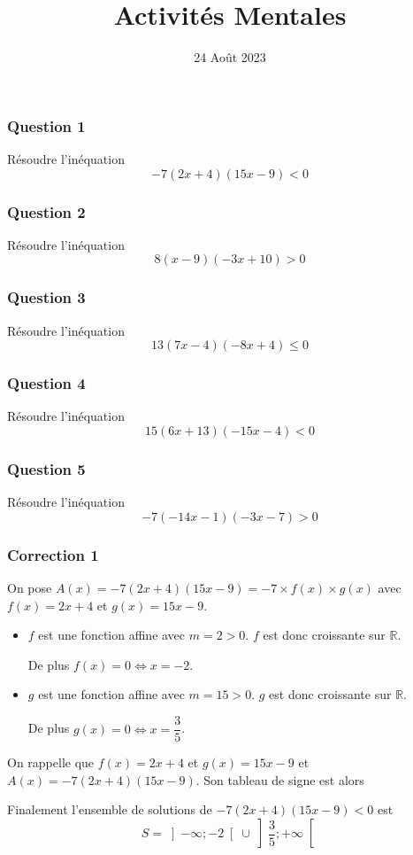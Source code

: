 \documentclass[15pt, mathserif]{beamer}
\title{Activités Mentales}
\date{24 Août 2023}
\begin{document}
\begin{frame}
    \titlepage
\end{frame}

\begin{frame} 
	\frametitle{Question 1}
Résoudre l'inéquation \[-7(2x+4)(15x-9)<0\]\end{frame}


\begin{frame} 
	\frametitle{Question 2}
Résoudre l'inéquation \[8(x-9)(-3x+10)>0\]\end{frame}


\begin{frame} 
	\frametitle{Question 3}
Résoudre l'inéquation \[13(7x-4)(-8x+4)\leq0\]\end{frame}


\begin{frame} 
	\frametitle{Question 4}
Résoudre l'inéquation \[15(6x+13)(-15x-4)<0\]\end{frame}


\begin{frame} 
	\frametitle{Question 5}
Résoudre l'inéquation \[-7(-14x-1)(-3x-7)>0\]\end{frame}


\begin{frame}
\vspace{-10mm}
	\frametitle{Correction 1}
On pose $A(x) = -7(2x+4)(15x-9) = -7\times f(x) \times g(x)$ avec $f(x) = 2x+4$ et $g(x) = 15x-9$.

\begin{itemize}
	\item $f$ est une fonction affine avec $m =2>0$. $f$ est donc croissante sur $\mathbb{R}$.

	 De plus $f(x) = 0 \Leftrightarrow x = -2$.
	\item $g$ est une fonction affine avec $m =15>0$. $g$ est donc croissante sur $\mathbb{R}$.

	 De plus $g(x) = 0 \Leftrightarrow x = \dfrac{3}{5}$.
\end{itemize}

 \end{frame}


\begin{frame}On rappelle que $f(x) = 2x+4$ et $g(x) = 15x-9$ et $A(x) = -7(2x+4)(15x-9)$. Son tableau de signe est alors 

\medskip \hfil
{}

 Finalement l'ensemble de solutions de $-7(2x+4)(15x-9)<0$ est\[S = \left]-\infty;-2\right[\cup\left]\dfrac{3}{5};+\infty\right[\]

\end{frame}
\end{document}
